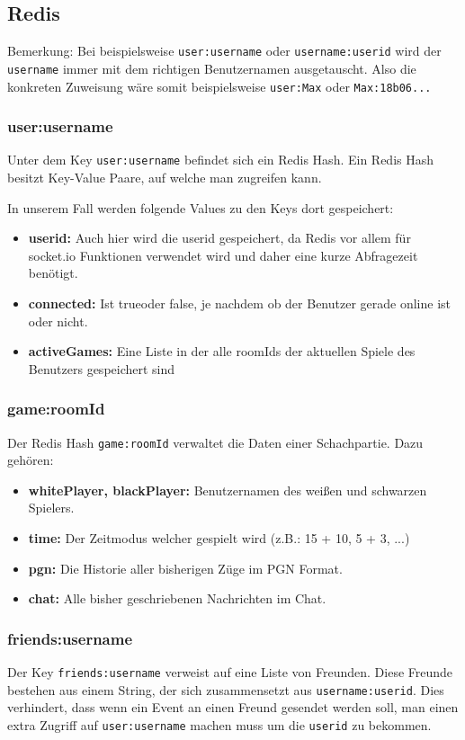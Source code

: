 \subsection{Redis}
\label{sec:redis-data}

Bemerkung: Bei beispielsweise \verb|user:username| oder \verb|username:userid| wird der \verb|username| immer mit dem richtigen Benutzernamen ausgetauscht. Also die konkreten Zuweisung wäre somit beispielsweise \verb|user:Max| oder \verb|Max:18b06...|
\subsubsection{user:username}
Unter dem Key \verb|user:username| befindet sich ein Redis Hash. Ein Redis Hash besitzt Key-Value Paare, auf welche man zugreifen kann.

In unserem Fall werden folgende Values zu den Keys dort gespeichert:
\begin{itemize}
\item \textbf{userid:} Auch hier wird die userid gespeichert, da Redis vor allem für socket.io Funktionen verwendet wird und daher eine kurze Abfragezeit benötigt.
\item \textbf{connected:} Ist \glqq true\grqq{ }oder \glqq false\grqq , je nachdem ob der Benutzer gerade online ist oder nicht.
\item \textbf{activeGames:} Eine Liste in der alle roomIds der aktuellen Spiele des Benutzers gespeichert sind
\end{itemize}

\subsubsection{game:roomId}
\label{sec:game:roomId}
Der Redis Hash \verb|game:roomId| verwaltet die Daten einer Schachpartie. Dazu gehören:
\begin{itemize}
\item \textbf{whitePlayer, blackPlayer:} Benutzernamen des weißen und schwarzen Spielers.
\item \textbf{time:} Der Zeitmodus welcher gespielt wird (z.B.: 15 + 10, 5 + 3, ...)
\item \textbf{pgn:} Die Historie aller bisherigen Züge im PGN Format.
\item \textbf{chat:} Alle bisher geschriebenen Nachrichten im Chat.
\end{itemize}

\subsubsection{friends:username}
\label{sec:friends:username}
Der Key \verb|friends:username| verweist auf eine Liste von Freunden. Diese Freunde bestehen aus einem String, der sich zusammensetzt aus \verb|username:userid|. Dies verhindert, dass wenn ein Event an einen Freund gesendet werden soll, man einen extra Zugriff auf \verb|user:username| machen muss um die \verb|userid| zu bekommen.

